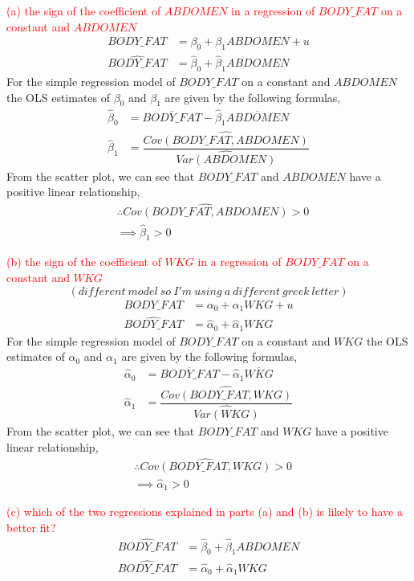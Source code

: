 \documentclass[12pt]{report}
\begin{document}
\noindent \textcolor{red}{(a) the sign of the coefficient of $ABDOMEN$ in a regression of $BODY\_FAT$ on a constant and $ABDOMEN$}
\begin{align*}
BODY\_FAT &= \beta_0 + \beta_1 ABDOMEN + u \\
\widehat{BODY\_FAT} &= \hat{\beta}_0 + \hat{\beta}_1 ABDOMEN
\end{align*}
\noindent For the simple regression model of $BODY\_FAT$ on a constant and $ABDOMEN$ the OLS estimates of $\beta_0$ and $\beta_1$ are given by the following formulas,
\begin{align*}
\hat{\beta}_0 &= \overline{BODY\_FAT} - \hat{\beta}_1\overline{ABDOMEN} \\
\hat{\beta}_1 &= \dfrac{\widehat{Cov(BODY\_FAT,ABDOMEN)}}{\widehat{Var(ABDOMEN)}}
\end{align*}
\noindent From the scatter plot, we can see that $BODY\_FAT$ and $ABDOMEN$ have a positive linear relationship, 
\begin{align*}
&\therefore \widehat{Cov(BODY\_FAT,ABDOMEN)}>0 \\
&\implies \hat{\beta}_1 > 0
\end{align*}

\noindent \textcolor{red}{(b) the sign of the coefficient of $WKG$ in a regression of $BODY\_FAT$ on a constant and $WKG$}$$(different\ model\ so\ I'm\ using\ a\ different\ greek\ letter)$$
\begin{align*}
BODY\_FAT &= \alpha_0 + \alpha_1 WKG + u \\
\widehat{BODY\_FAT} &= \hat{\alpha}_0 + \hat{\alpha}_1 WKG
\end{align*}
\noindent For the simple regression model of $BODY\_FAT$ on a constant and $WKG$ the OLS estimates of $\alpha_0$ and $\alpha_1$ are given by the following formulas,
\begin{align*}
\hat{\alpha}_0 &= \overline{BODY\_FAT} - \hat{\alpha}_1\overline{WKG} \\
\hat{\alpha}_1 &= \dfrac{\widehat{Cov(BODY\_FAT,WKG)}}{\widehat{Var(WKG)}}
\end{align*}
\noindent From the scatter plot, we can see that $BODY\_FAT$ and $WKG$ have a positive linear relationship, 
\begin{align*}
&\therefore \widehat{Cov(BODY\_FAT,WKG)}>0 \\
&\implies \hat{\alpha}_1 > 0
\end{align*}

\noindent \textcolor{red}{(c) which of the two regressions explained in parts (a) and (b) is likely to have a better fit?} 
\begin{align}
\widehat{BODY\_FAT} &= \hat{\beta}_0 + \hat{\beta}_1 ABDOMEN \\
\widehat{BODY\_FAT} &= \hat{\alpha}_0 + \hat{\alpha}_1 WKG
\end{align}
\end{document}
